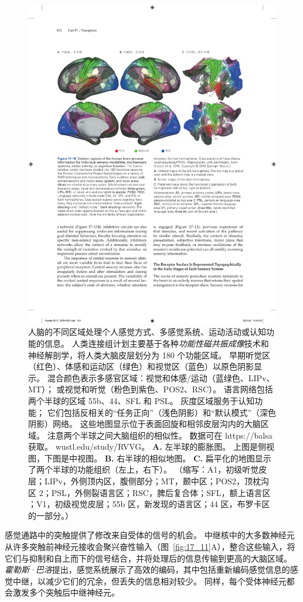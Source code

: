 \begin{figure}[htbp]
	\centering
	\includegraphics[width=0.7\linewidth]{chap17/fig_17_10}
	\caption{人脑的不同区域处理个人感觉方式、多感觉系统、运动活动或认知功能的信息。
		人类连接组计划主要基于各种\textit{功能性磁共振成像}技术和神经解剖学，将人类大脑皮层划分为 180 个功能区域。 
		早期听觉区（红色）、体感和运动区（绿色）和视觉区（蓝色）以原色阴影显示。
		混合颜色表示多感官区域：视觉和体感/运动（蓝绿色、LIPv、MT）； 或视觉和听觉（粉色到紫色、POS2、RSC）。
		语言网络包括两个半球的区域 55b、44、SFL 和 PSL。
		灰度区域服务于认知功能； 它们包括反相关的“任务正向”（浅色阴影）和“默认模式”（深色阴影）网络。 
		这些地图显示位于表面回旋和相邻皮层沟内的大脑区域。
		注意两个半球之间大脑组织的相似性\cite{glasser2016multi}。
		数据可在 https://balsa 获取。 wustl.edu/study/RVVG。
		\textbf{A.} 左半球的膨胀图。 上图是侧视图，下图是中视图。
		\textbf{B.} 右半球的相似地图。 
		\textbf{C.} 扁平化的地图显示了两个半球的功能组织（左上，右下）。 
		（缩写：A1，初级听觉皮层；LIPv，外侧顶内区，腹侧部分；MT，颞中区；POS2，顶枕沟区 2；PSL，外侧裂语言区；RSC，脾后复合体；SFL，额上语言区 ；V1，初级视觉皮层；55b 区，新发现的语言区；44 区，布罗卡区的一部分。）}
	\label{fig:17_10}
\end{figure}


感觉通路中的突触提供了修改来自受体的信号的机会。 
中继核中的大多数神经元从许多突触前神经元接收会聚兴奋性输入（图~\ref{fig:17_11}A），整合这些输入，将它们与抑制和自上而下的信号结合，并将处理后的信息传输到更高的大脑区域。 
\textit{霍勒斯·巴洛}提出，感觉系统展示了高效的编码，其中包括重新编码感觉信息的感觉中继，以减少它们的冗余，但丢失的信息相对较少。 
同样，每个受体神经元都会激发多个突触后中继神经元。


